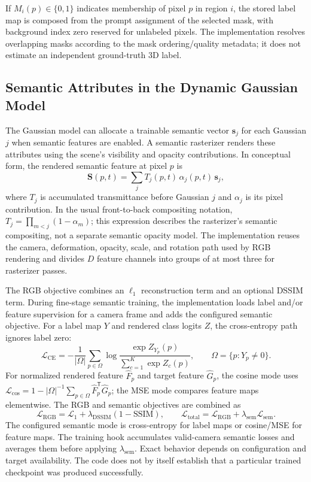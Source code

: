 \documentclass[conference]{IEEEtran}
\begin{document}
If $M_i(p)\in\{0,1\}$ indicates membership of pixel $p$ in region $i$, the stored label map is composed from the prompt assignment of the selected mask, with background index zero reserved for unlabeled pixels. The implementation resolves overlapping masks according to the mask ordering/quality metadata; it does not estimate an independent ground-truth 3D label.

\subsection{Semantic Attributes in the Dynamic Gaussian Model}
The Gaussian model can allocate a trainable semantic vector $\mathbf{s}_j$ for each Gaussian $j$ when semantic features are enabled. A semantic rasterizer renders these attributes using the scene's visibility and opacity contributions. In conceptual form, the rendered semantic feature at pixel $p$ is
\begin{equation}
\mathbf{S}(p,t) = \sum_j T_j(p,t)\,\alpha_j(p,t)\,\mathbf{s}_j,
\end{equation}
where $T_j$ is accumulated transmittance before Gaussian $j$ and $\alpha_j$ is its pixel contribution. In the usual front-to-back compositing notation, $T_j=\prod_{m<j}(1-\alpha_m)$; this expression describes the rasterizer's semantic compositing, not a separate semantic opacity model. The implementation reuses the camera, deformation, opacity, scale, and rotation path used by RGB rendering and divides $D$ feature channels into groups of at most three for rasterizer passes.

The RGB objective combines an $\ell_1$ reconstruction term and an optional DSSIM term. During fine-stage semantic training, the implementation loads label and/or feature supervision for a camera frame and adds the configured semantic objective. For a label map $Y$ and rendered class logits $Z$, the cross-entropy path ignores label zero:
\begin{equation}
\mathcal{L}_{\mathrm{CE}}=-\frac{1}{|\Omega|}\sum_{p\in\Omega}\log\frac{\exp Z_{Y_p}(p)}{\sum_{c=1}^{K}\exp Z_c(p)}, \qquad \Omega=\{p:Y_p\ne 0\}.
\end{equation}
For normalized rendered feature $\hat{F}_p$ and target feature $\hat{G}_p$, the cosine mode uses $\mathcal{L}_{\cos}=1-|\Omega|^{-1}\sum_{p\in\Omega}\hat{F}_p^{\mathsf T}\hat{G}_p$; the MSE mode compares feature maps elementwise. The RGB and semantic objectives are combined as
\begin{equation}
\mathcal{L}_{\mathrm{RGB}}=\mathcal{L}_{1}+\lambda_{\mathrm{DSSIM}}(1-\mathrm{SSIM}),\qquad
\mathcal{L}_{\mathrm{total}}=\mathcal{L}_{\mathrm{RGB}}+\lambda_{\mathrm{sem}}\mathcal{L}_{\mathrm{sem}}.
\end{equation}
The configured semantic mode is cross-entropy for label maps or cosine/MSE for feature maps. The training hook accumulates valid-camera semantic losses and averages them before applying $\lambda_{\mathrm{sem}}$. Exact behavior depends on configuration and target availability. The code does not by itself establish that a particular trained checkpoint was produced successfully.
\end{document}
